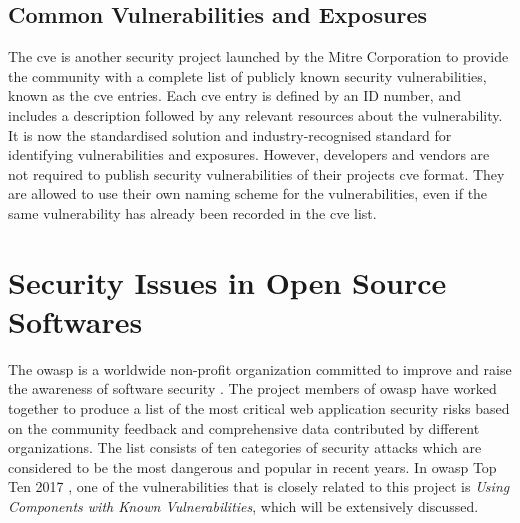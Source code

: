 \documentclass[12pt, a4paper]{report}
\begin{document}
\subsection{Common Vulnerabilities and Exposures}
The \acrfull{cve} is another security project launched by the Mitre Corporation \cite{cve} to
provide the community with a complete list of publicly known security vulnerabilities, known as the
\acrshort{cve} entries. Each \acrshort{cve} entry is defined by an ID number, and includes a
description followed by any relevant resources about the vulnerability. It is now the standardised
solution and industry-recognised standard for identifying vulnerabilities and exposures. However,
developers and vendors are not required to publish security vulnerabilities of their projects
\acrshort{cve} format. They are allowed to use their own naming scheme for the vulnerabilities, even
if the same vulnerability has already been recorded in the \acrshort{cve} list.

\section{Security Issues in Open Source Softwares}
The \acrfull{owasp} is a worldwide non-profit organization committed to improve and raise the
awareness of software security \cite{owasp_home}. The project members of \acrshort{owasp} have
worked together to produce a list of the most critical web application security risks based on the
community feedback and comprehensive data contributed by different organizations. The list consists
of ten categories of security attacks which are considered to be the most dangerous and popular in
recent years. In \acrshort{owasp} Top Ten 2017 \cite{owasp_top10}, one of the vulnerabilities that
is closely related to this project is \textit{Using Components with Known Vulnerabilities}, which
will be extensively discussed.
\end{document}
